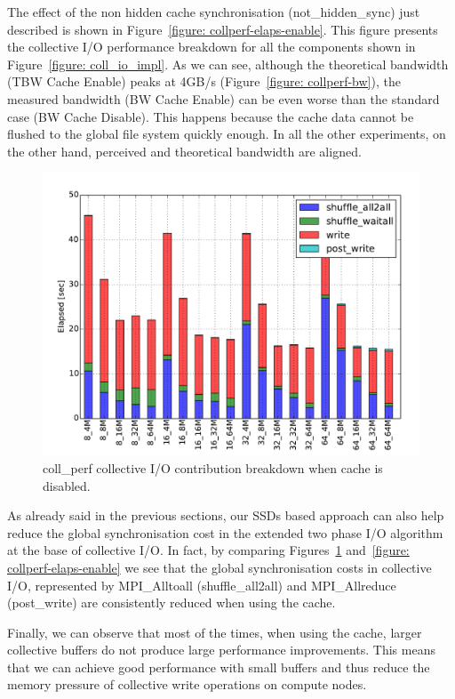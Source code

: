 The effect of the non hidden cache synchronisation (not\_hidden\_sync) just described is shown in Figure~\ref{figure: collperf-elaps-enable}. This figure presents the collective I/O performance breakdown for all the components shown in Figure~\ref{figure: coll_io_impl}. As we can see, although the theoretical bandwidth (TBW Cache Enable) peaks at 4GB/s (Figure~\ref{figure: collperf-bw}), the measured bandwidth (BW Cache Enable) can be even worse than the standard case (BW Cache Disable). This happens because the cache data cannot be flushed to the global file system quickly enough. In all the other experiments, on the other hand, perceived and theoretical bandwidth are aligned.
\begin{figure}[htb]
  \centering
  \includegraphics[width=0.9\columnwidth]{figures/coll_perf_32GB_30sec_elapsed_disable}
  \caption{coll\_perf collective I/O contribution breakdown when cache is disabled.}
  \label{figure: collperf-elaps-disable}
\end{figure}
As already said in the previous sections, our SSDs based approach can also help reduce the global synchronisation cost in the extended two phase I/O algorithm at the base of collective I/O.
In fact, by comparing Figures~\ref{figure: collperf-elaps-disable} and~\ref{figure: collperf-elaps-enable} we see that the global synchronisation costs in collective I/O, represented by MPI\_Alltoall (shuffle\_all2all) and MPI\_Allreduce (post\_write) are consistently reduced when using the cache.

Finally, we can observe that most of the times, when using the cache, larger collective buffers do not produce large performance improvements. This means that we can achieve good performance with small buffers and thus reduce the memory pressure of collective write operations on compute nodes.

